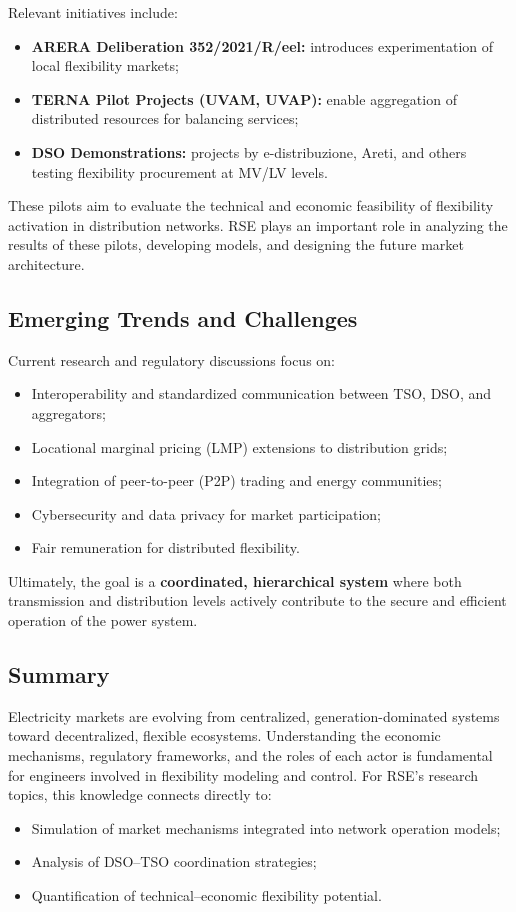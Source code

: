\documentclass[11pt]{article}
\begin{document}
	Relevant initiatives include:
	\begin{itemize}
		\item \textbf{ARERA Deliberation 352/2021/R/eel:} introduces experimentation of local flexibility markets;
		\item \textbf{TERNA Pilot Projects (UVAM, UVAP):} enable aggregation of distributed resources for balancing services;
		\item \textbf{DSO Demonstrations:} projects by e-distribuzione, Areti, and others testing flexibility procurement at MV/LV levels.
	\end{itemize}
	
	These pilots aim to evaluate the technical and economic feasibility of flexibility activation in distribution networks.  
	RSE plays an important role in analyzing the results of these pilots, developing models, and designing the future market architecture.
	
	\subsection{Emerging Trends and Challenges}
	
	Current research and regulatory discussions focus on:
	\begin{itemize}
		\item Interoperability and standardized communication between TSO, DSO, and aggregators;
		\item Locational marginal pricing (LMP) extensions to distribution grids;
		\item Integration of peer-to-peer (P2P) trading and energy communities;
		\item Cybersecurity and data privacy for market participation;
		\item Fair remuneration for distributed flexibility.
	\end{itemize}
	
	Ultimately, the goal is a \textbf{coordinated, hierarchical system} where both transmission and distribution levels actively contribute to the secure and efficient operation of the power system.
	
	\subsection*{Summary}
	
	Electricity markets are evolving from centralized, generation-dominated systems toward decentralized, flexible ecosystems.  
	Understanding the economic mechanisms, regulatory frameworks, and the roles of each actor is fundamental for engineers involved in flexibility modeling and control.  
	For RSE’s research topics, this knowledge connects directly to:
	\begin{itemize}
		\item Simulation of market mechanisms integrated into network operation models;
		\item Analysis of DSO–TSO coordination strategies;
		\item Quantification of technical–economic flexibility potential.
	\end{itemize}
	
\end{document}
